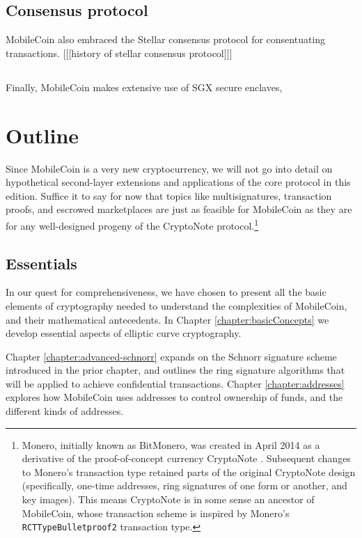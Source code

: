 \subsection{Consensus protocol}

MobileCoin also embraced the Stellar consensus protocol for consentuating transactions. [[[history of stellar consensus protocol]]]


\subsection{}

Finally, MobileCoin makes extensive use of SGX secure enclaves, 
\fi


\section{Outline}

Since MobileCoin is a very new cryptocurrency, we will not go into detail on hypothetical second-layer extensions and applications of the core protocol in this edition. Suffice it to say for now that topics like multisignatures, transaction proofs, and escrowed marketplaces are just as feasible for MobileCoin as they are for any well-designed progeny of the CryptoNote protocol.\footnote{Monero, initially known as BitMonero, was created in April 2014 as a derivative of the proof-of-concept currency CryptoNote \cite{bitmonero-launched}. Subsequent changes to Monero's transaction type retained parts of the original CryptoNote design (specifically, one-time addresses, ring signatures of one form or another, and key images). This means CryptoNote is in some sense an ancestor of MobileCoin, whose transaction scheme is inspired by Monero's {\tt RCTTypeBulletproof2} transaction type.}


\subsection{Essentials}%

In our quest for comprehensiveness, we have chosen to present all the basic elements of cryptography needed to understand the complexities of MobileCoin, and their mathematical antecedents. In Chapter \ref{chapter:basicConcepts} we develop essential aspects of elliptic curve cryptography.

Chapter \ref{chapter:advanced-schnorr} expands on the Schnorr signature scheme introduced in the prior chapter, and outlines the ring signature algorithms that will be applied to achieve confidential transactions. Chapter \ref{chapter:addresses} explores how MobileCoin uses addresses to control ownership of funds, and the different kinds of addresses.

